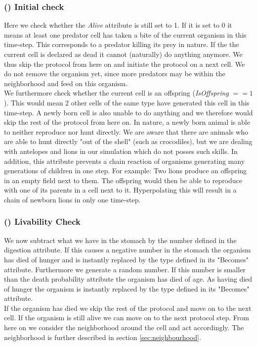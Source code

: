\documentclass[11pt]{article}
\begin{document}
\subsubsection{() Initial check} 
Here we check whether the {\it Alive} attribute is still set to 1. If it is set to 0 it means at least one predator cell has taken a bite of the current organism in this time-step.  This corresponds to a predator killing its prey in nature. If the the current cell is declared as dead it cannot (naturally) do anything anymore. We thus skip the protocol from here on and initiate the protocol on a next cell. We do not remove the organism yet, since more predators may be within the neighborhood and feed on this organism.
\\We furthermore check whether the current cell is an offspring ({\it IsOffspring} $== 1$). This would mean 2 other cells of the same type have generated this cell in this time-step. A newly born cell is also unable to do anything and we therefore would skip the rest of the protocol from here on. In nature, a newly born animal is able to neither reproduce nor hunt directly. We are aware that there are animals who are able to hunt directly "out of the shell" (such as crocodiles), but we are dealing with antelopes and lions in our simulation which do not posses such skills. In addition, this attribute prevents a chain reaction of organisms generating many generations of children in one step. For example: Two lions produce an offspring in an empty field next to them. The offspring would then be able to reproduce with one of its parents in a cell next to it. Hyperpolating this will result in a chain of newborn lions in only one time-step.

\addtocounter{protocolCounter}{1}
\subsubsection{() Livability Check} 
We now subtract what we have in the stomach by the number defined in the digestion attribute. If this causes a negative number in the stomach the organism has died of hunger and is instantly replaced by the type defined in its "Becomes" attribute. Furthermore we generate a random number. If this number is smaller than the death probability attribute the organism has died of age. As having died of hunger the organism is instantly replaced by the type defined in its "Becomes" attribute.\\
If the organism has died we skip the rest of the protocol and move on to the next cell. If the organism is still alive we can move on to the next protocol step. From here on we consider the neighborhood around the cell and act accordingly. The neighborhood is further described in section \ref{sec:neighbourhood}.
\addtocounter{protocolCounter}{1}
\end{document}

